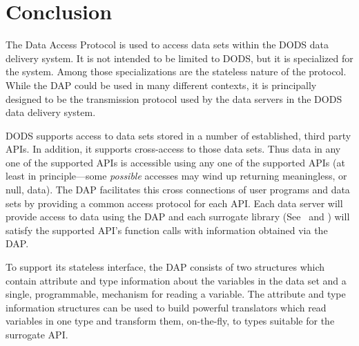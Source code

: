 \section{Conclusion}

The Data Access Protocol is used to access data sets within the DODS data
delivery system. It is not intended to be limited to DODS, but it is
specialized for the system. Among those specializations are the stateless
nature of the protocol. While the DAP could be used in many different
contexts, it is principally designed to be the transmission protocol used by
the data servers in the DODS data delivery system.

DODS supports access to data sets stored in a number of established, third
party APIs. In addition, it supports cross-access to those data sets. Thus
data in any one of the supported APIs is accessible using any one of the
supported APIs (at least in principle---some {\em possible\/} accesses may
wind up returning meaningless, or null, data). The DAP facilitates this cross
connections of user programs and data sets by providing a common
access protocol for each API\@. Each data server will provide access to data
using the DAP and each surrogate library (See \DDA\ and \DDD) will satisfy
the supported API's function calls with information obtained via the DAP\@.

To support its stateless interface, the DAP consists of two structures which
contain attribute and type information about the variables in the data set
and a single, programmable, mechanism for reading a variable. The attribute
and type information structures can be used to build powerful translators
which read variables in one type and transform them, on-the-fly, to types
suitable for the surrogate API\@. 

\clearpage







